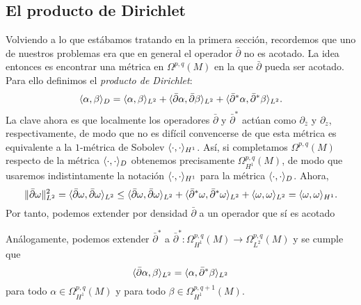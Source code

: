 \documentclass[12pt,a4paper]{article}
\theoremstyle{definition} \newtheorem{defn}[thm]{Definición}
\theoremstyle{definition} \newtheorem{ejemplo}[thm]{Ejemplo}
\theoremstyle{definition} \newtheorem{ejercicio}[thm]{Ejercicio}
\theoremstyle{remark} \newtheorem*{obs}{Observación}
\DeclarePairedDelimiter\norm{\lVert}{\rVert}
\DeclarePairedDelimiter\esc{\langle}{\rangle}
\newcommand{\dol}{\bar{\partial}}
\begin{document}
   \subsection{El producto de Dirichlet}
   Volviendo a lo que estábamos tratando en la primera sección, recordemos que uno de nuestros problemas era que en general el operador $\dol$ no es acotado. La idea entonces es encontrar una métrica en $\Omega^{p,q}(M)$ en la que $\dol$ pueda ser acotado. Para ello definimos el \emph{producto de Dirichlet}:
   \begin{equation*}
     \esc{\alpha,\beta}_{D} = \esc{\alpha,\beta}_{L^2} + \esc{\dol \alpha, \dol \beta}_{L^2} + \esc{\dol^*\alpha, \dol^*\beta}_{L^2}.
   \end{equation*}
   La clave ahora es que localmente los operadores $\dol$ y $\dol^*$ actúan como $\partial_{\bar{z}}$ y $\partial_{z}$, respectivamente, de modo que no es difícil convencerse de que esta métrica es equivalente a la $1$-métrica de Sobolev $\esc{\cdot,\cdot}_{H^1}$. Así, si completamos $\Omega^{p,q}(M)$ respecto de la métrica $\esc{\cdot,\cdot}_D$ obtenemos precisamente $\Omega^{p,q}_{H^1}(M)$, de modo que usaremos indistintamente la notación $\esc{\cdot,\cdot}_{H^1}$ para la métrica $\esc{\cdot,\cdot}_D$. Ahora,
   \begin{equation*}
     \norm{\dol \omega}_{L^2}^2 = \esc{\dol \omega,\dol \omega}_{L^2} \leq \esc{\dol \omega, \dol \omega}_{L^2} + \esc{\dol^* \omega, \dol^*\omega}_{L^2} + \esc{\omega, \omega}_{L^2} = \esc{\omega,\omega}_{H^1}.
   \end{equation*}
   Por tanto, podemos extender por densidad $\dol$ a un operador que sí es acotado
   \begin{center}
    \end{center}
    Análogamente, podemos extender $\dol^*$ a $\dol^*:\Omega^{p,q}_{H^1}(M) \rightarrow \Omega^{p,q}_{L^2}(M)$ y se cumple que
    \begin{equation*}
      \esc{\dol \alpha, \beta}_{L^2}= \esc{\alpha, \dol^*\beta}_{L^2}
    \end{equation*}
    para todo $\alpha \in \Omega^{p,q}_{H^1}(M)$ y para todo $\beta \in \Omega^{p,q+1}_{H^1}(M)$.
\end{document}
